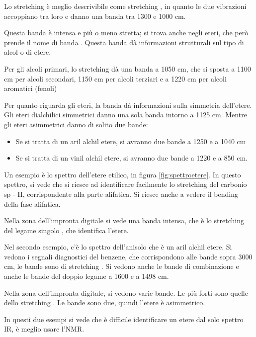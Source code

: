 
Lo stretching  è meglio descrivibile come stretching , in quanto
le due vibrazioni accoppiano tra loro e danno una banda tra 1300 e 1000 cm.

Questa banda è intensa e più o meno stretta; si trova anche negli eteri,
che però prende il nome di banda .
Questa banda dà informazioni strutturali sul tipo di alcol o di etere.

Per gli alcoli primari, lo stretching  dà una banda a 1050 cm, che
si sposta a 1100 cm per alcoli secondari, 1150 cm per alcoli
terziari e a 1220 cm per alcoli aromatici (fenoli)

Per quanto riguarda gli eteri, la banda dà informazioni sulla simmetria
dell'etere. Gli eteri dialchilici simmetrici danno una sola banda
intorno a 1125 cm. Mentre gli eteri asimmetrici danno di solito due bande:
\begin{itemize}
\item Se si tratta di un aril alchil etere, si avranno due bande a 1250 e a 1040 cm
\item Se si tratta di un vinil alchil etere, si avranno due bande a 1220 e a 850
cm.
\end{itemize}

Un esempio è lo spettro dell'etere etilico, in figura \ref{fig:spettroetere}. In questo spettro, si vede
che si riesce ad identificare facilmente lo stretching del carbonio sp - H, corrispondente alla parte alifatica. Si riesce anche a vedere il
bending della fase alifatica.

Nella zona dell'impronta digitale si vede una banda intensa, che è lo
stretching del legame singolo , che identifica l'etere.

Nel secondo esempio, c'è lo spettro dell'anisolo che è un aril alchil
etere. Si vedono i segnali diagnostici del benzene, che corrispondono
alle bande sopra 3000 cm, le bande sono di stretching . Si vedono
anche le bande di combinazione e anche le bande del doppio legame a 1600
e a 1498 cm.

Nella zona dell'impronta digitale, si vedono varie bande. Le più forti
sono quelle dello stretching . Le bande sono due, quindi l'etere è
asimmetrico.

In questi due esempi si vede che è difficile identificare un etere dal
solo spettro IR, è meglio usare l'NMR.

